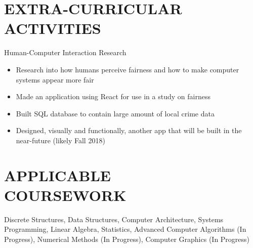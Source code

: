 \documentclass[margin]{res}
\begin{document}
\begin{resume}
\section{EXTRA-CURRICULAR \\ ACTIVITIES}             
                Human-Computer Interaction Research
                \begin{itemize} \itemsep -2pt %
                    \item Research into how humans perceive fairness and how to make computer systems appear more fair
                    \item Made an application using React for use in a study on fairness
                    \item Built SQL database to contain large amount of local crime data
                    \item Designed, visually and functionally, another app that will be built in the near-future (likely Fall 2018)
                \end{itemize}


\section{APPLICABLE \\ COURSEWORK}             
Discrete Structures, Data Structures, Computer Architecture, Systems Programming, Linear Algebra, Statistics, Advanced Computer Algorithms (In Progress), Numerical Methods (In Progress), Computer Graphics (In Progress)

\end{resume}
\end{document}
